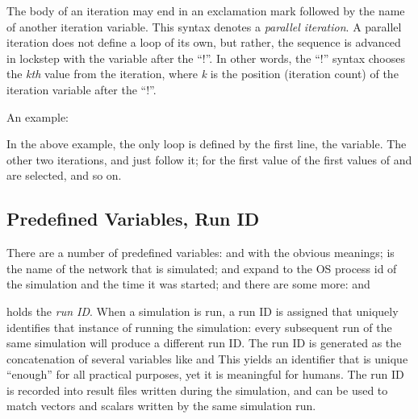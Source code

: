 The body of an iteration may end in an exclamation mark followed by the
name of another iteration variable. This syntax denotes a \textit{parallel
iteration}. A parallel iteration does not define a loop of its own, but
rather, the sequence is advanced in lockstep with the variable after the
``!''. In other words, the ``!'' syntax chooses the \textit{kth} value from
the iteration, where \textit{k} is the position (iteration count) of the
iteration variable after the ``!''.

An example:


In the above example, the only loop is defined by the first line, the 
variable. The other two iterations,  and  just follow it;
for the first value of  the first values of  and 
are selected, and so on.



\subsection{Predefined Variables, Run ID}
\label{sec:config-sim:predefined-variables}

There are a number of predefined variables:  and
 with the obvious meanings;  is the
name of the network that is simulated;  and
 expand to the OS process id of the simulation and the
time it was started; and there are some more: 
 and 

 holds the \textit{run ID}. When a simulation is run, a
run ID is assigned that uniquely identifies that instance of running the
simulation: every subsequent run of the same simulation will produce a different
run ID. The run ID is generated as the concatenation of several variables like
   and
 This yields an identifier that is unique ``enough''
for all practical purposes, yet it is meaningful for humans. The run ID is
recorded into result files written during the simulation, and can be used
to match vectors and scalars written by the same simulation run.


